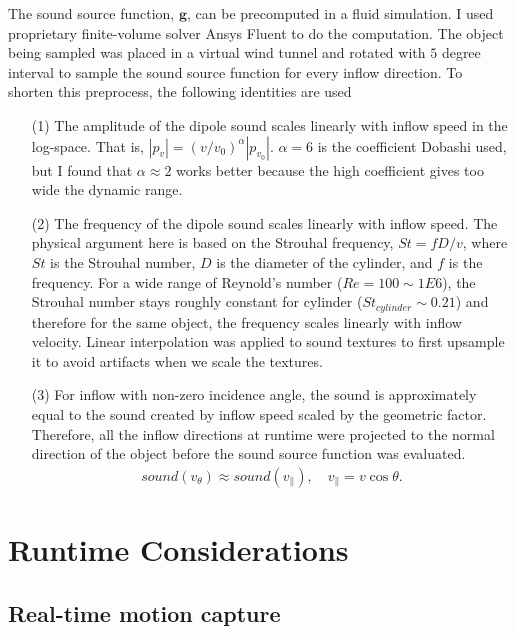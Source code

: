 \documentclass[tog]{acmsiggraph}
\def\mb{\mathbf}
\begin{document}
The sound source function, $\mb{g}$, can be precomputed in a fluid simulation. I used proprietary finite-volume solver Ansys Fluent to do the computation. The object being sampled was placed in a virtual wind tunnel and rotated with $5$ degree interval to sample the sound source function for every inflow direction. To shorten this preprocess, the following identities are used
\begin{itemize}
    \item [(1)] The amplitude of the dipole sound scales linearly with inflow speed in the log-space. That is, $|p_v| = (v/v_0)^\alpha |p_{v_0}|$. $\alpha=6$ is the coefficient Dobashi used, but I found that $\alpha \approx 2$ works better because the high coefficient gives too wide the dynamic range.
    \item [(2)] The frequency of the dipole sound scales linearly with inflow speed. The physical argument here is based on the Strouhal frequency, $St = f D/v$, where $St$ is the Strouhal number, $D$ is the diameter of the cylinder, and $f$ is the frequency. For a wide range of Reynold's number ($Re=100 \sim 1E6$), the Strouhal number stays roughly constant for cylinder ($St_{cylinder} \sim 0.21$) and therefore for the same object, the frequency scales linearly with inflow velocity. Linear interpolation was applied to sound textures to first upsample it to avoid artifacts when we scale the textures. 
    \item [(3)] For inflow with non-zero incidence angle, the sound is approximately equal to the sound created by inflow speed scaled by the geometric factor. Therefore, all the inflow directions at runtime were projected to the normal direction of the object before the sound source function was evaluated. 
\begin{align}
    sound(v_\theta) \approx  sound(v_{\|}), \quad v_{\|} = v \cos\theta. \label{eq:incidence}
\end{align}

\end{itemize}


\section{Runtime Considerations} \label{section:runtime}



\subsection{Real-time motion capture}
\end{document}
